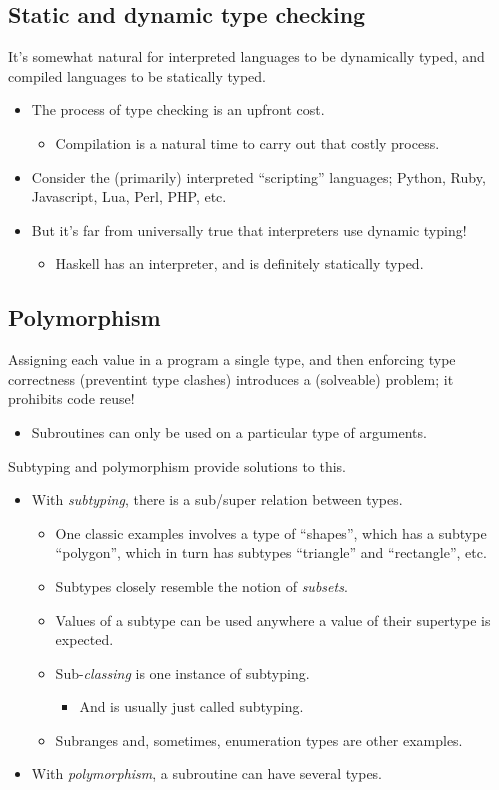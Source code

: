 \documentclass[11pt]{article}
\theoremstyle{definition}
\begin{document}
\subsection{Static and dynamic type checking}
\label{sec:orgf2b1436}
It's somewhat natural for interpreted languages to be dynamically typed,
and compiled languages to be statically typed.
\begin{itemize}
\item The process of type checking is an upfront cost.
\begin{itemize}
\item Compilation is a natural time to carry out that costly process.
\end{itemize}
\item Consider the (primarily) interpreted “scripting” languages;
Python, Ruby, Javascript, Lua, Perl, PHP, etc.
\item But it's far from universally true that interpreters use
dynamic typing!
\begin{itemize}
\item Haskell has an interpreter, and is definitely
statically typed.
\end{itemize}
\end{itemize}

\subsection{Polymorphism}
\label{sec:org6e48263}
Assigning each value in a program a single type, and then
enforcing type correctness (preventint type clashes)
introduces a (solveable) problem; it prohibits code reuse!
\begin{itemize}
\item Subroutines can only be used on a particular type of arguments.
\end{itemize}

Subtyping and polymorphism provide solutions to this.
\begin{itemize}
\item With \emph{subtyping}, there is a sub/super relation between types.
\begin{itemize}
\item One classic examples involves a type of “shapes”, which has
a subtype “polygon”, which in turn has subtypes “triangle”
and “rectangle”, etc.
\item Subtypes closely resemble the notion of \emph{subsets}.
\item Values of a subtype can be used anywhere
a value of their supertype is expected.
\item Sub-\emph{classing} is one instance of subtyping.
\begin{itemize}
\item And is usually just called subtyping.
\end{itemize}
\item Subranges and, sometimes, enumeration types are other examples.
\end{itemize}
\item With \emph{polymorphism}, a subroutine can have several types.
\end{itemize}
\end{document}
